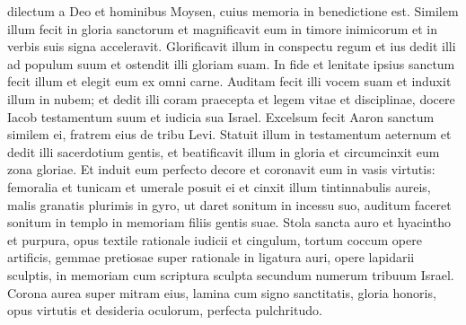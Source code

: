 \begin{biblechapter}
\begin{biblechapter}
\begin{biblechapter}
\begin{biblechapter}
\begin{biblechapter}
\begin{biblechapter}
\begin{biblechapter}
\begin{biblechapter}
\begin{biblechapter}
\begin{biblechapter}
\begin{biblechapter}
\begin{biblechapter}
\begin{biblechapter}
\begin{biblechapter}
\begin{biblechapter}
\begin{biblechapter}
\begin{biblechapter}
\begin{biblechapter}
\begin{biblechapter}
\begin{biblechapter}
\begin{biblechapter}
\begin{biblechapter}
\begin{biblechapter}
\begin{biblechapter}
\begin{biblechapter}
\begin{biblechapter}
\begin{biblechapter}
\begin{biblechapter}
\begin{biblechapter}
\begin{biblechapter}
\begin{biblechapter}
\begin{biblechapter}
\begin{biblechapter}
\begin{biblechapter}
\begin{biblechapter}
\begin{biblechapter}
\begin{biblechapter}
\begin{biblechapter}
\begin{biblechapter}
\begin{biblechapter}
\begin{biblechapter}
\begin{biblechapter}
\begin{biblechapter}
\begin{biblechapter}
\begin{biblechapter}
\verse dilectum a Deo et hominibus
 Moysen, cuius memoria in benedictione est.
 \verse Similem illum fecit in gloria sanctorum
 et magnificavit eum in timore inimicorum
 et in verbis suis signa acceleravit.
 \verse Glorificavit illum in conspectu regum
 et ius dedit illi ad populum suum
 et ostendit illi gloriam suam.
 \verse In fide et lenitate ipsius sanctum fecit illum
 et elegit eum ex omni carne.
 \verse Auditam fecit illi vocem suam
 et induxit illum in nubem;
 \verse et dedit illi coram praecepta
 et legem vitae et disciplinae,
 docere Iacob testamentum suum
 et iudicia sua Israel.
 \verse Excelsum fecit Aaron sanctum similem ei,
 fratrem eius de tribu Levi.
 \verse Statuit illum in testamentum aeternum
 et dedit illi sacerdotium gentis,
 et beatificavit illum in gloria
 \verse et circumcinxit eum zona gloriae.
 Et induit eum perfecto decore
 et coronavit eum in vasis virtutis:
 \verse femoralia et tunicam et umerale posuit ei
 et cinxit illum tintinnabulis aureis,
 malis granatis plurimis in gyro,
 \verse ut daret sonitum in incessu suo,
 auditum faceret sonitum in templo
 in memoriam filiis gentis suae.
 \verse Stola sancta auro et hyacintho et purpura,
 opus textile rationale iudicii et cingulum,
 \verse tortum coccum opere artificis,
 gemmae pretiosae super rationale
 in ligatura auri, opere lapidarii sculptis,
 in memoriam cum scriptura sculpta secundum numerum tribuum Israel.
 \verse Corona aurea super mitram eius,
 lamina cum signo sanctitatis, gloria honoris,
 opus virtutis et desideria oculorum, perfecta pulchritudo.

\end{biblechapter}
\end{biblechapter}
\end{biblechapter}
\end{biblechapter}
\end{biblechapter}
\end{biblechapter}
\end{biblechapter}
\end{biblechapter}
\end{biblechapter}
\end{biblechapter}
\end{biblechapter}
\end{biblechapter}
\end{biblechapter}
\end{biblechapter}
\end{biblechapter}
\end{biblechapter}
\end{biblechapter}
\end{biblechapter}
\end{biblechapter}
\end{biblechapter}
\end{biblechapter}
\end{biblechapter}
\end{biblechapter}
\end{biblechapter}
\end{biblechapter}
\end{biblechapter}
\end{biblechapter}
\end{biblechapter}
\end{biblechapter}
\end{biblechapter}
\end{biblechapter}
\end{biblechapter}
\end{biblechapter}
\end{biblechapter}
\end{biblechapter}
\end{biblechapter}
\end{biblechapter}
\end{biblechapter}
\end{biblechapter}
\end{biblechapter}
\end{biblechapter}
\end{biblechapter}
\end{biblechapter}
\end{biblechapter}
\end{biblechapter}
